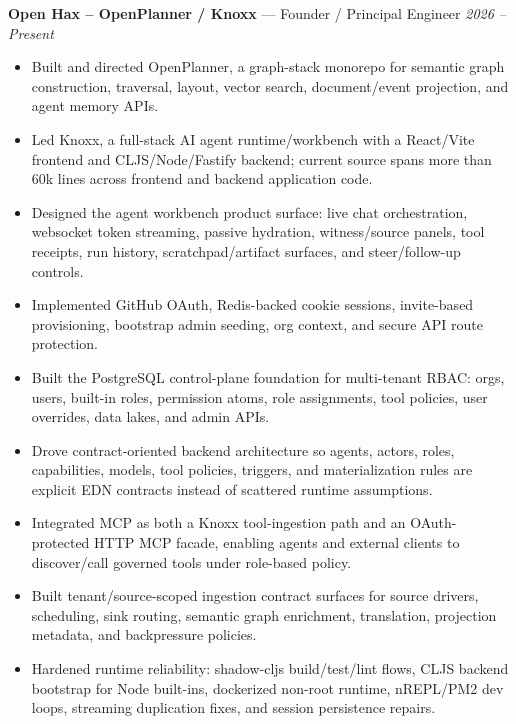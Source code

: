 \documentclass[10pt]{article}
\begin{document}
\textbf{Open Hax -- OpenPlanner / Knoxx} --- Founder / Principal Engineer \hfill \textit{2026 -- Present}\\
\vspace{-7pt}
\begin{itemize}
  \setlength\itemsep{-3pt}
  \setlength\parskip{0pt}
  \setlength\parsep{0pt}
  \item Built and directed OpenPlanner, a graph-stack monorepo for semantic graph construction, traversal, layout, vector search, document/event projection, and agent memory APIs.
  \item Led Knoxx, a full-stack AI agent runtime/workbench with a React/Vite frontend and CLJS/Node/Fastify backend; current source spans more than 60k lines across frontend and backend application code.
  \item Designed the agent workbench product surface: live chat orchestration, websocket token streaming, passive hydration, witness/source panels, tool receipts, run history, scratchpad/artifact surfaces, and steer/follow-up controls.
  \item Implemented GitHub OAuth, Redis-backed cookie sessions, invite-based provisioning, bootstrap admin seeding, org context, and secure API route protection.
  \item Built the PostgreSQL control-plane foundation for multi-tenant RBAC: orgs, users, built-in roles, permission atoms, role assignments, tool policies, user overrides, data lakes, and admin APIs.
  \item Drove contract-oriented backend architecture so agents, actors, roles, capabilities, models, tool policies, triggers, and materialization rules are explicit EDN contracts instead of scattered runtime assumptions.
  \item Integrated MCP as both a Knoxx tool-ingestion path and an OAuth-protected HTTP MCP facade, enabling agents and external clients to discover/call governed tools under role-based policy.
  \item Built tenant/source-scoped ingestion contract surfaces for source drivers, scheduling, sink routing, semantic graph enrichment, translation, projection metadata, and backpressure policies.
  \item Hardened runtime reliability: shadow-cljs build/test/lint flows, CLJS backend bootstrap for Node built-ins, dockerized non-root runtime, nREPL/PM2 dev loops, streaming duplication fixes, and session persistence repairs.
\end{itemize}
\end{document}
